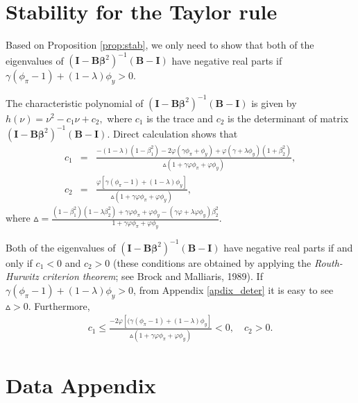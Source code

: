 \begin{appendix}
\section{Stability for the Taylor rule}\label{corpsacroof}
 Based on Proposition \ref{prop:stab}, we only need to show that both of the eigenvalues of $({\pmb I}-{\pmb B\pmb \beta}^2)^{-1}({\pmb B}-{\pmb I})$ have negative real parts if $\gamma(\phi_\pi-1)+(1-\lambda)\phi_y>0$.

 The characteristic polynomial of $({\pmb I}-{\pmb B\pmb \beta}^2)^{-1}({\pmb B}-{\pmb I})$ is given by $h(\nu)=\nu^2-c_1\nu+c_2,$
where $c_1$ is the trace and $c_2$ is the determinant of matrix $({\pmb I}-{\pmb B\pmb \beta}^2)^{-1}({\pmb B}-{\pmb I})$. Direct calculation shows that
\begin{eqnarray}
c_1&=&\frac{-(1-\lambda)(1-\beta_1^2)-2\varphi(\gamma\phi_\pi+\phi_y)+\varphi(\gamma+\lambda\phi_y)(1+\beta_2^2)}{\vartriangle(1+\gamma\varphi\phi_\pi+\varphi\phi_y)},\\
c_2&=&\frac{\varphi[\gamma(\phi_\pi-1)+(1-\lambda)\phi_y]}{\vartriangle(1+\gamma\varphi\phi_\pi+\varphi\phi_y)},
\end{eqnarray}
where $\vartriangle=\frac{(1-\beta_1^2)(1-\lambda\beta_2^2)+\gamma\varphi\phi_\pi+\varphi\phi_y-(\gamma\varphi+\lambda\varphi\phi_y)\beta_2^2}{1+\gamma\varphi\phi_\pi+\varphi\phi_y}$.

Both of the eigenvalues of $({\pmb I}-{\pmb B\pmb \beta}^2)^{-1}({\pmb B}-{\pmb I})$ have negative real parts if and only if $c_1<0$ and $c_2>0$ (these conditions are obtained by applying the \emph{Routh-Hurwitz criterion theorem}; see Brock and Malliaris, 1989). If $\gamma(\phi_\pi-1)+(1-\lambda)\phi_y>0$,  from Appendix \ref{apdix_deter} it is easy to see $\vartriangle>0$. Furthermore,
\begin{eqnarray*}
c_1\leq\frac{-2\varphi[(\gamma(\phi_\pi-1)+(1-\lambda)\phi_y]}{\vartriangle(1+\gamma\varphi\phi_\pi+\varphi\phi_y)}<0,\quad c_2>0.
\end{eqnarray*}

\section{Data Appendix} 
\label{app_data}


\end{appendix}
